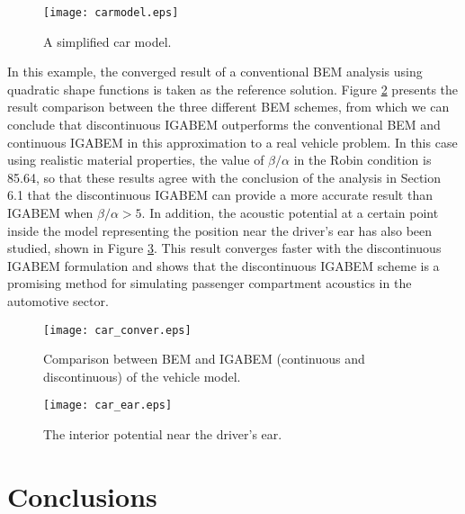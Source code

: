 \documentclass[review]{elsarticle}
\begin{document}
\begin{figure}[!htp]
	\centering
	\texttt{[image: carmodel.eps]}
	\caption{A simplified car model.}
	\label{simple_car}
\end{figure}

In this example, the converged result of a conventional BEM analysis using quadratic shape functions is  taken as the reference solution. Figure \ref{car_conver} presents the result comparison between the three different BEM schemes, from which we can conclude that discontinuous IGABEM outperforms the conventional BEM and continuous IGABEM in this approximation to a real vehicle problem. In this case using realistic material properties, the value of $\beta/\alpha$ in the Robin condition is 85.64, so that these results agree with the conclusion of the analysis in Section 6.1 that the discontinuous IGABEM can provide a more accurate result than IGABEM when $\beta/\alpha>5$. In addition, the acoustic potential at a certain point inside the model representing the position near the driver's ear has also been studied, shown in Figure \ref{car_ear}. This result converges faster with the discontinuous IGABEM formulation and shows that the discontinuous IGABEM scheme is a promising method for simulating passenger compartment acoustics in the automotive sector.
\begin{figure}[!htb]
	\centering
	\texttt{[image: car\_conver.eps]}
	\caption{Comparison between BEM and IGABEM (continuous and discontinuous) of the vehicle model.}
	\label{car_conver}
\end{figure}


\begin{figure}[!htb]
	\centering
	\texttt{[image: car\_ear.eps]}
	\caption{The interior potential near the driver's ear.}
	\label{car_ear}
\end{figure}

\section{Conclusions}
\end{document}
